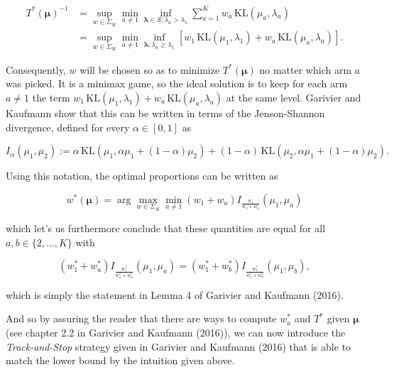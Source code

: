 \documentclass[12pt,]{article}
\newcommand{\KL}{\,\text{KL}}
\begin{document}
\begin{align*}
T^*(\bm{\mu})^{-1} & = \sup_{w \in \Sigma_K} \min_{a \neq 1} \inf_{\bm{\lambda} \in \mathcal{S}: \lambda_a > \lambda_1} \sum_{a=1}^K w_a \KL(\mu_a, \lambda_a)  \\
& = \sup_{w \in \Sigma_K} \min_{a \neq 1} \inf_{\bm{\lambda}: \lambda_a \geq \lambda_1} [w_1 \KL(\mu_1, \lambda_1)+w_a \KL(\mu_a, \lambda_a)].
\end{align*}

Consequently, \(w\) will be chosen so as to minimize \(T^*(\bm{\mu})\)
no matter which arm \(a\) was picked. It is a minimax game, so the ideal
solution is to keep for each arm \(a \neq 1\) the term
\(w_1 \KL(\mu_1, \lambda_1) + w_a \KL(\mu_a, \lambda_a)\) at the same
level. Garivier and Kaufmann show that this can be written in terms of
the Jenson-Shannon divergence, defined for every \(\alpha \in [0,1]\) as

\begin{equation*}
I_{\alpha}(\mu_1, \mu_2) := \alpha \KL(\mu_1, \alpha \mu_1 + (1-\alpha) \mu_2) + (1-\alpha) \KL(\mu_2, \alpha \mu_1 + (1-\alpha) \mu_2).
\end{equation*}

Using this notation, the optimal proportions can be written as

\begin{equation*}
w^*(\bm{\mu}) = \arg \max_{w \in \Sigma_K} \min_{a \neq 1} (w_1 + w_a) I_{\frac{w_1}{w_1+w_a}}(\mu_1, \mu_a)
\end{equation*}

which let's us furthermore conclude that these quantities are equal for
all \(a,b \in \{2,\dots, K\}\) with

\begin{equation*}
(w_1^* + w_a^*) I_{\frac{w_1^*}{w_1^*+w_a^*}}(\mu_1, \mu_a) = (w_1^* + w_b^*) I_{\frac{w_1^*}{w_1^*+w_b^*}}(\mu_1, \mu_b),
\end{equation*}

which is simply the statement in Lemma 4 of Garivier and Kaufmann
(2016).

And so by assuring the reader that there are ways to compute \(w_a^*\)
and \(T^*\) given \(\bm{\mu}\) (see chapter 2.2 in Garivier and Kaufmann
(2016)), we can now introduce the \emph{Track-and-Stop} strategy given
in Garivier and Kaufmann (2016) that is able to match the lower bound by
the intuition given above.
\end{document}

